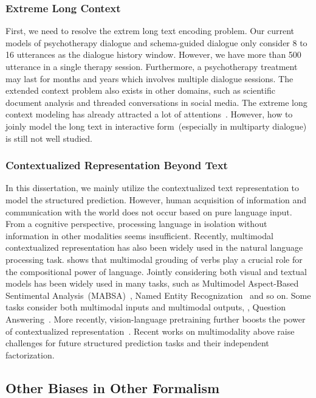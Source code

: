 \subsubsection{Extreme Long Context}
\label{sssec:future:extrem-long-context}
First, we need to resolve the extrem long text encoding problem. Our
current models of psychotherapy dialogue and schema-guided dialogue only
consider 8 to 16 utterances as the dialogue history window. However,
we have more than 500 utterance in a single therapy
session. Furthermore, a psychotherapy treatment may last for months
and years which involves multiple dialogue sessions. The extended
context problem also exists in other domains, such as scientific
document analysis and threaded conversations in social media. The
extreme long context modeling has already attracted a lot of
attentions~\citep{tay2020long,gu2021efficiently}. However, how to
joinly model the long text in interactive form~(especially in
multiparty dialogue) is still not well studied.


\subsubsection{Contextualized Representation Beyond Text}
\label{sssec:future:beyond-text}
In this dissertation, we mainly utilize the contextualized text
representation to model the structured prediction. However, human
acquisition of information and communication with the world does not
occur based on pure language input. From a cognitive perspective,
processing language in isolation without information in other
modalities seems insufficient. Recently, multimodal contextualized
representation has also been widely used in the natural language
processing task. \citet{beinborn-etal-2018-multimodal} shows that
multimodal grouding of verbs play a crucial role for the compositional
power of language. Jointly considering both visual and textual models
has been widely used in many tasks, such as Multimodel Aspect-Based
Sentimental Analysis~(MABSA)~\cite{ju2021joint}, Named Entity
Recognization~\cite{zhang2021multi} and so on. Some tasks consider
both multimodal inputs and multimodal outputs, \eg, Question
Answering~\cite{singh-etal-2021-mimoqa}. More recently,
vision-language pretraining further boosts the power of
contextualized
representation~\cite{lu2019vilbert,ling-etal-2022-vision}. Recent
works on multimodality above raise challenges for future structured
prediction tasks and their independent factorization.

\subsection{Other Biases in Other Formalism}
\label{ssec:future:other-biases}

